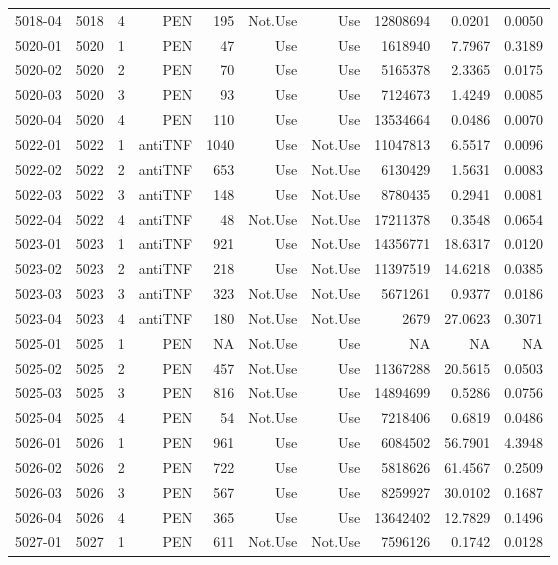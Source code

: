 {\begin{longtable}{ | r | r | r | r | r | r | r | r | r | r | }
5018-04 & 5018 & 4 & PEN & 195 & Not.Use & Use & 12808694 & 0.0201 & 0.0050\\ 
5020-01 & 5020 & 1 & PEN & 47 & Use & Use & 1618940 & 7.7967 & 0.3189\\ 
5020-02 & 5020 & 2 & PEN & 70 & Use & Use & 5165378 & 2.3365 & 0.0175\\ 
5020-03 & 5020 & 3 & PEN & 93 & Use & Use & 7124673 & 1.4249 & 0.0085\\ 
5020-04 & 5020 & 4 & PEN & 110 & Use & Use & 13534664 & 0.0486 & 0.0070\\ 
5022-01 & 5022 & 1 & antiTNF & 1040 & Use & Not.Use & 11047813 & 6.5517 & 0.0096\\ 
5022-02 & 5022 & 2 & antiTNF & 653 & Use & Not.Use & 6130429 & 1.5631 & 0.0083\\ 
5022-03 & 5022 & 3 & antiTNF & 148 & Use & Not.Use & 8780435 & 0.2941 & 0.0081\\ 
5022-04 & 5022 & 4 & antiTNF & 48 & Not.Use & Not.Use & 17211378 & 0.3548 & 0.0654\\ 
5023-01 & 5023 & 1 & antiTNF & 921 & Use & Not.Use & 14356771 & 18.6317 & 0.0120\\ 
5023-02 & 5023 & 2 & antiTNF & 218 & Use & Not.Use & 11397519 & 14.6218 & 0.0385\\ 
5023-03 & 5023 & 3 & antiTNF & 323 & Not.Use & Not.Use & 5671261 & 0.9377 & 0.0186\\ 
5023-04 & 5023 & 4 & antiTNF & 180 & Not.Use & Not.Use & 2679 & 27.0623 & 0.3071\\ 
5025-01 & 5025 & 1 & PEN & NA & Not.Use & Use & NA & NA & NA\\ 
5025-02 & 5025 & 2 & PEN & 457 & Not.Use & Use & 11367288 & 20.5615 & 0.0503\\ 
5025-03 & 5025 & 3 & PEN & 816 & Not.Use & Use & 14894699 & 0.5286 & 0.0756\\ 
5025-04 & 5025 & 4 & PEN & 54 & Not.Use & Use & 7218406 & 0.6819 & 0.0486\\ 
5026-01 & 5026 & 1 & PEN & 961 & Use & Use & 6084502 & 56.7901 & 4.3948\\ 
5026-02 & 5026 & 2 & PEN & 722 & Use & Use & 5818626 & 61.4567 & 0.2509\\ 
5026-03 & 5026 & 3 & PEN & 567 & Use & Use & 8259927 & 30.0102 & 0.1687\\ 
5026-04 & 5026 & 4 & PEN & 365 & Use & Use & 13642402 & 12.7829 & 0.1496\\ 
5027-01 & 5027 & 1 & PEN & 611 & Not.Use & Not.Use & 7596126 & 0.1742 & 0.0128\\ 

\end{longtable}}
